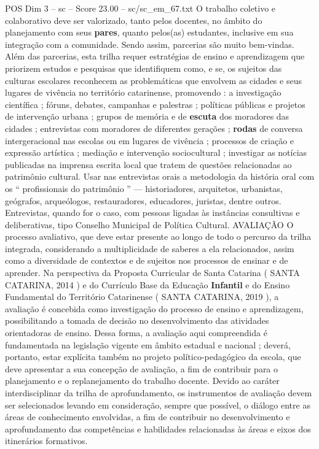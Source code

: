 \begin{textsample}{POS Dim 3 – sc – Score 23.00 – sc/sc\_em\_67.txt}
O trabalho coletivo e colaborativo deve ser valorizado, tanto pelos docentes, no âmbito do planejamento com seus \textbf{pares}, quanto pelos(as) estudantes, inclusive em sua integração com a comunidade.
Sendo assim, parcerias são muito bem-vindas.
Além das parcerias, esta trilha requer estratégias de ensino e aprendizagem que priorizem estudos e pesquisas que identifiquem como, e se, os sujeitos das culturas escolares reconhecem as problemáticas que envolvem as cidades e seus lugares de vivência no território catarinense, promovendo : a investigação científica ; fóruns, debates, campanhas e palestras ; políticas públicas e projetos de intervenção urbana ; grupos de memória e de \textbf{escuta} dos moradores das cidades ; entrevistas com moradores de diferentes gerações ; \textbf{rodas} de conversa intergeracional nas escolas ou em lugares de vivência ; processos de criação e expressão artística ; mediação e intervenção sociocultural ; investigar as notícias publicadas na imprensa escrita local que tratem de questões relacionadas ao patrimônio cultural.
Usar nas entrevistas orais a metodologia da história oral com os “ profissionais do patrimônio ” — historiadores, arquitetos, urbanistas, geógrafos, arqueólogos, restauradores, educadores, juristas, dentre outros.
Entrevistas, quando for o caso, com pessoas ligadas às instâncias consultivas e deliberativas, tipo Conselho Municipal de Política Cultural.
AVALIAÇÃO O processo avaliativo, que deve estar presente ao longo de todo o percurso da trilha integrada, considerando a multiplicidade de saberes a ela relacionados, assim como a diversidade de contextos e de sujeitos nos processos de ensinar e de aprender.
Na perspectiva da Proposta Curricular de Santa Catarina ( SANTA CATARINA, 2014 ) e do Currículo Base da Educação \textbf{Infantil} e do Ensino Fundamental do Território Catarinense ( SANTA CATARINA, 2019 ), a avaliação é concebida como investigação do processo de ensino e aprendizagem, possibilitando a tomada de decisão no desenvolvimento das atividades orientadoras de ensino.
Dessa forma, a avaliação aqui compreendida é fundamentada na legislação vigente em âmbito estadual e nacional ; deverá, portanto, estar explícita também no projeto político-pedagógico da escola, que deve apresentar a sua concepção de avaliação, a fim de contribuir para o planejamento e o replanejamento do trabalho docente.
Devido ao caráter interdisciplinar da trilha de aprofundamento, os instrumentos de avaliação devem ser selecionados levando em consideração, sempre que possível, o diálogo entre as áreas de conhecimento envolvidas, a fim de contribuir no desenvolvimento e aprofundamento das competências e habilidades relacionadas às áreas e eixos dos itinerários formativos.

\end{textsample}
